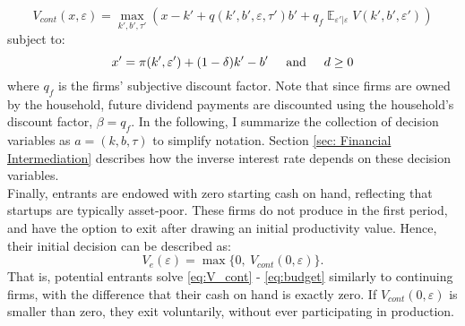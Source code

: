 \documentclass[12pt]{article}
\DeclareMathOperator{\E}{\mathbb{E}}
\begin{document}
\begin{equation} \label{eq:V_cont}
 V_{cont}(x,\varepsilon) = \max_{k',b', \tau'} \left(x - k' +  q(k',b',\varepsilon, \tau')b' + q_f \E_{\varepsilon'|\varepsilon} V(k',b', \varepsilon') \right)
\end{equation}
subject to: 
\begin{equation} \label{eq:budget}
x' = \pi(k',\varepsilon')+(1-\delta)k'-b' \hspace{5mm} \text{and} \hspace{5mm} d \geq 0
\end{equation} 
where $q_f$ is the firms' subjective discount factor. Note that since firms are owned by the household, future dividend payments are discounted using the household's discount factor, $\beta = q_f$. In the following, I summarize the collection of decision variables as $a = (k, b, \tau) $ to simplify notation. Section \ref{sec: Financial Intermediation} describes how the inverse interest rate depends on these decision variables. \vspace{3mm} \\
Finally, entrants are endowed with zero starting cash on hand, reflecting that startups are typically asset-poor. These firms do not produce in the first period, and have the option to exit after drawing an initial productivity value. Hence, their initial decision can be described as: 
\begin{equation} \label{eq:entrant decision}
 V_e(\varepsilon) = \max \{0, \ V_{cont}(0,\varepsilon) \}.
\end{equation}
That is, potential entrants solve \ref{eq:V_cont} - \ref{eq:budget} similarly to continuing firms, with the difference that their cash on hand is exactly zero. If $V_{cont}(0,\varepsilon)$ is smaller than zero, they exit voluntarily, without ever participating in production.
\end{document}
